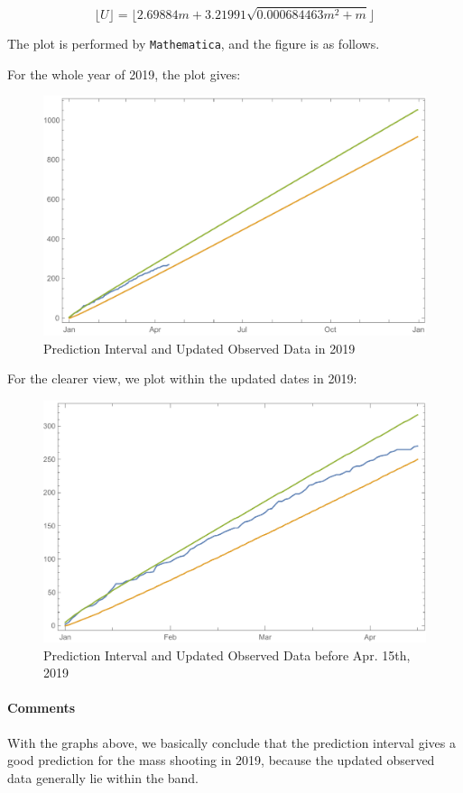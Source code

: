 \documentclass[a4paper]{article}
\begin{document}
$$\lfloor U \rfloor = \lfloor 2.69884m + 3.21991\sqrt{0.000684463m^2 + m} \rfloor $$

The plot is performed by \texttt{Mathematica}, and the figure is as follows.

For the whole year of 2019, the plot gives:
\begin{figure}[!htbp]
\centering
\includegraphics[width=1\linewidth]{predictall.pdf}
\caption{Prediction Interval and Updated Observed Data in 2019}
\end{figure}

\newpage

For the clearer view, we plot within the updated dates in 2019:
\begin{figure}[!htbp]
\centering
\includegraphics[width=1\linewidth]{predictapril.pdf}
\caption{Prediction Interval and Updated Observed Data before Apr. 15th, 2019}
\end{figure}

\paragraph{Comments}
With the graphs above, we basically conclude that the prediction interval gives a good prediction for the mass shooting in 2019, because the updated observed data generally lie within the band.
\end{document}
